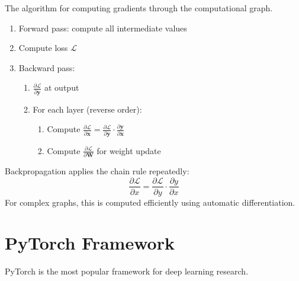 The algorithm for computing gradients through the computational graph.

\begin{algorithm}[Backpropagation]
\begin{enumerate}
    \item Forward pass: compute all intermediate values
    \item Compute loss $\mathcal{L}$
    \item Backward pass:
    \begin{enumerate}
        \item $\frac{\partial \mathcal{L}}{\partial \mathbf{y}}$ at output
        \item For each layer (reverse order):
        \begin{enumerate}
            \item Compute $\frac{\partial \mathcal{L}}{\partial \mathbf{x}} = \frac{\partial \mathcal{L}}{\partial \mathbf{y}} \cdot \frac{\partial \mathbf{y}}{\partial \mathbf{x}}$
            \item Compute $\frac{\partial \mathcal{L}}{\partial \mathbf{W}}$ for weight update
        \end{enumerate}
    \end{enumerate}
\end{enumerate}
\end{algorithm}

\begin{note}
Backpropagation applies the chain rule repeatedly:
\begin{equation}
\frac{\partial \mathcal{L}}{\partial x} = \frac{\partial \mathcal{L}}{\partial y} \cdot \frac{\partial y}{\partial x}
\end{equation}
For complex graphs, this is computed efficiently using automatic differentiation.
\end{note}

\section{PyTorch Framework}

PyTorch is the most popular framework for deep learning research.


